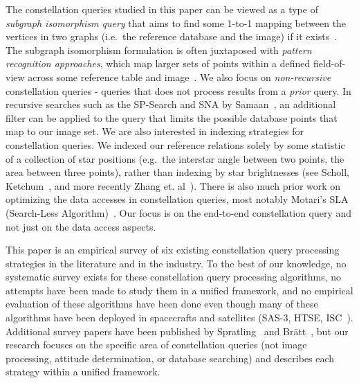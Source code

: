 The constellation queries studied in this paper can be viewed as a type of \emph{subgraph isomorphism query} that aims to find some 1-to-1 mapping between the vertices in two graphs (i.e.\ the reference database and the image) if it exists~\cite{scott:graphIsomorphismProblem}.
The subgraph isomorphism formulation is often juxtaposed with \emph{pattern recognition approaches}, which map larger sets of points within a defined field-of-view across some reference table and image~\cite{padgett:gridAlgorithm}.
We also focus on \emph{non-recursive} constellation queries - queries that does not process results from a \emph{prior} query.
In recursive searches such as the SP-Search and SNA by Samaan~\cite{samaan:recursiveMode}, an additional filter can be applied to the query that limits the possible database points that map to our image set.
We are also interested in indexing strategies for constellation queries.
We indexed our reference relations solely by some statistic of a collection of star positions (e.g.\ the interstar angle between two points, the area between three points), rather than indexing by star brightnesses (see Scholl\cite{scholl:starFieldIdentification}, Ketchum~\cite{ketchum:onboardStarIdentification}, and more recently Zhang et. al~\cite{zhang:brightnessReferenced}).
There is also much prior work on optimizing the data accesses in constellation queries, most notably Motari's SLA (Search-Less Algorithm)~\cite{mortari:kVectorApproach}.
Our focus is on the end-to-end constellation query and not just on the data access aspects. 

This paper is an empirical survey of six existing constellation query processing strategies in the literature and in the industry.
To the best of our knowledge, no systematic survey exists for these constellation query processing algorithms, no attempts have been made to study them in a unified framework, and no empirical evaluation of these algorithms have been done even though many of these algorithms have been deployed in spacecrafts and satellites (SAS-3, HTSE, ISC~\cite{gottlieb:spacecraftAttitudeDetermination,mortari:pyramidIdentification}).
Additional survey papers have been published by Spratling~\cite{spratling:surveyStarIdentification} and
Br\"{a}tt~\cite{bratt:analysisStarIdentification}, but our research focuses on the specific area of constellation queries (not image processing, attitude determination, or database searching) and describes each strategy within a unified framework.

